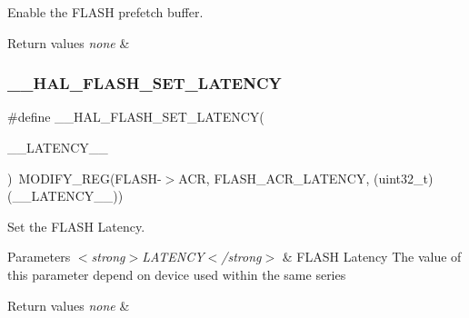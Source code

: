 Enable the F\+L\+A\+SH prefetch buffer. 


\begin{DoxyRetVals}{Return values}
{\em none} & \\
\hline
\end{DoxyRetVals}
\mbox{\label{group___f_l_a_s_h___exported___macros_gac1c9f459b798cc3700b90a6245df5a1a}} 
\subsubsection{\texorpdfstring{\_\_HAL\_FLASH\_SET\_LATENCY}{\_\_HAL\_FLASH\_SET\_LATENCY}}
{\footnotesize\ttfamily \#define \+\_\+\+\_\+\+H\+A\+L\+\_\+\+F\+L\+A\+S\+H\+\_\+\+S\+E\+T\+\_\+\+L\+A\+T\+E\+N\+CY(\begin{DoxyParamCaption}\item[{}]{\+\_\+\+\_\+\+L\+A\+T\+E\+N\+C\+Y\+\_\+\+\_\+ }\end{DoxyParamCaption})~M\+O\+D\+I\+F\+Y\+\_\+\+R\+EG(F\+L\+A\+SH-\/$>$A\+CR, F\+L\+A\+S\+H\+\_\+\+A\+C\+R\+\_\+\+L\+A\+T\+E\+N\+CY, (uint32\+\_\+t)(\+\_\+\+\_\+\+L\+A\+T\+E\+N\+C\+Y\+\_\+\+\_\+))}



Set the F\+L\+A\+SH Latency. 


\begin{DoxyParams}{Parameters}
{\em $<$strong$>$\+L\+A\+T\+E\+N\+C\+Y$<$/strong$>$} & F\+L\+A\+SH Latency The value of this parameter depend on device used within the same series \\
\hline
\end{DoxyParams}

\begin{DoxyRetVals}{Return values}
{\em none} & \\
\hline
\end{DoxyRetVals}
